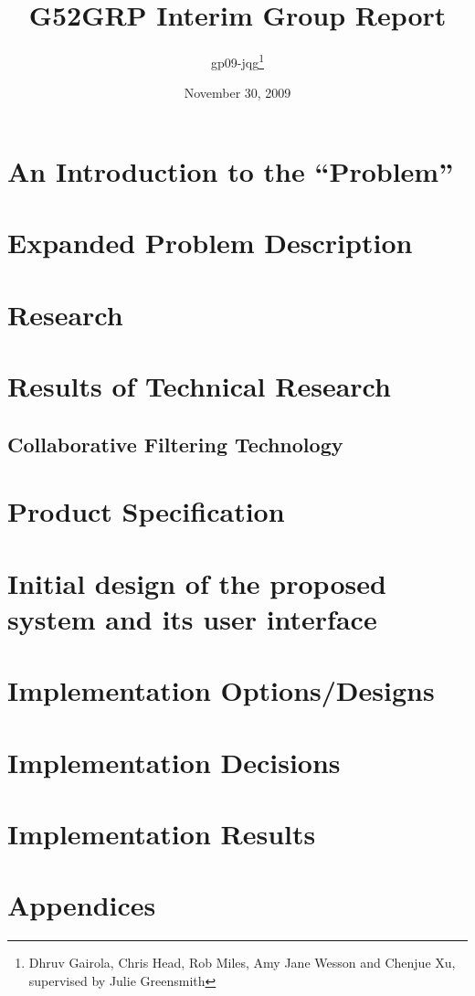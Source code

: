 \documentclass[12pt]{article}
\title{G52GRP Interim Group Report}                     %
\author{gp09-jqg\thanks{Dhruv Gairola, Chris Head, Rob Miles, Amy Jane Wesson and Chenjue Xu, supervised by Julie Greensmith}} %
\date{November 30, 2009}                                    %
\begin{document}
\maketitle                                              %


\tableofcontents
\newpage

\section{An Introduction to the ``Problem''}

\newpage

\section{Expanded Problem Description}

\newpage

\section{Research} %

\newpage

\section{Results of Technical Research}		%


\subsection{Collaborative Filtering Technology}

\newpage

\section{Product Specification} 			%
\label{sec:productspec}

\newpage

\section{Initial design of the proposed system and its user interface}

\newpage

\section{Implementation Options/Designs}

\newpage

\section{Implementation Decisions}

\newpage


\section{Implementation Results}

\newpage

\section{Appendices}


\newpage
\end{document}
